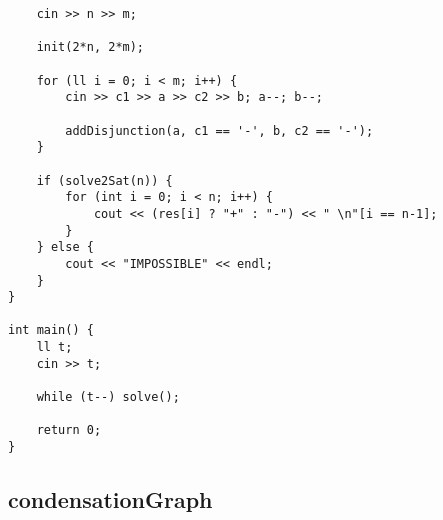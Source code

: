 \documentclass[landscape,twocolumn,10pt,a4paper]{article}
\begin{document}
\begin{verbatim}
    cin >> n >> m;

    init(2*n, 2*m);

    for (ll i = 0; i < m; i++) {
        cin >> c1 >> a >> c2 >> b; a--; b--;
        
        addDisjunction(a, c1 == '-', b, c2 == '-');
    }

    if (solve2Sat(n)) {
        for (int i = 0; i < n; i++) {
            cout << (res[i] ? "+" : "-") << " \n"[i == n-1];
        }
    } else {
        cout << "IMPOSSIBLE" << endl;
    }
}

int main() {
    ll t;
    cin >> t;

    while (t--) solve();

    return 0;
}\end{verbatim}

\subsection{condensationGraph}
\end{document}
